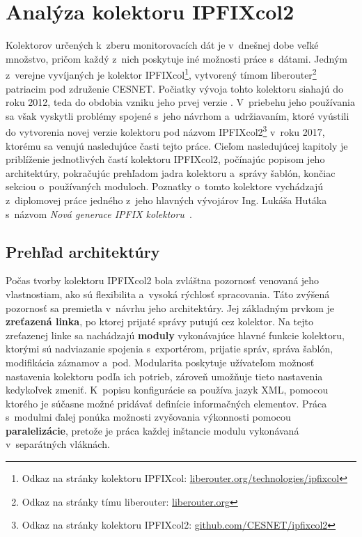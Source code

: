 
\chapter{Analýza kolektoru IPFIXcol2}
\label{chpt:kolektor}

Kolektorov určených k~zberu monitorovacích dát je v~dnešnej dobe veľké množstvo, pričom každý z~nich poskytuje iné možnosti práce s~dátami. Jedným z~verejne vyvíjaných je kolektor IPFIXcol\footnote{Odkaz na stránky kolektoru IPFIXcol:
\href{https://www.liberouter.org/technologies/ipfixcol/}{liberouter.org/technologies/ipfixcol}}, vytvorený tímom liberouter\footnote{Odkaz na stránky tímu liberouter: \href{https://www.liberouter.org}{liberouter.org}} patriacim pod združenie CESNET. Počiatky vývoja tohto kolektoru
siahajú do roku 2012, teda do obdobia vzniku jeho prvej verzie \cite{ipfixcol}. V~priebehu jeho používania sa však vyskytli problémy spojené s~jeho návrhom a~udržiavaním, ktoré vyústili do vytvorenia novej verzie kolektoru pod názvom
IPFIXcol2\footnote{Odkaz na stránky kolektoru IPFIXcol2: \href{https://github.com/CESNET/ipfixcol2}{github.com/CESNET/ipfixcol2}} v~roku 2017, ktorému sa venujú nasledujúce časti tejto práce. Cieľom nasledujúcej kapitoly je priblíženie jednotlivých častí kolektoru IPFIXcol2,
počínajúc popisom jeho architektúry, pokračujúc prehľadom jadra kolektoru a~správy šablón, končiac sekciou o~používaných moduloch. Poznatky o~tomto kolektore vychádzajú z~diplomovej práce jedného z~jeho hlavných vývojárov Ing. Lukáša Hutáka s~názvom \textit{Nová generace IPFIX kolektoru}~\cite{hutak}.

\section{Prehľad architektúry}
\label{sec:ipfixcol2_zaklad}

Počas tvorby kolektoru IPFIXcol2 bola zvláštna pozornosť venovaná jeho vlastnostiam, ako sú flexibilita a~vysoká rýchlosť spracovania. Táto zvýšená pozornosť sa premietla v~návrhu jeho architektúry. Jej základným prvkom je \textbf{zreťazená linka}, po ktorej prijaté správy putujú cez kolektor.
Na tejto zreťazenej linke sa nachádzajú \textbf{moduly} vykonávajúce hlavné funkcie kolektoru, ktorými sú nadviazanie spojenia s~exportérom, prijatie správ, správa šablón, modifikácia záznamov a~pod. Modularita poskytuje užívateľom možnosť nastavenia kolektoru podľa ich potrieb,
zároveň umožňuje tieto nastavenia kedykoľvek zmeniť. K~popisu konfigurácie sa používa jazyk XML, pomocou ktorého je súčasne možné pridávať definície informačných elementov. Práca s~modulmi ďalej ponúka možnosti zvyšovania výkonnosti pomocou
\textbf{paralelizácie}, pretože je práca každej inštancie modulu vykonávaná v~separátných vláknách.

